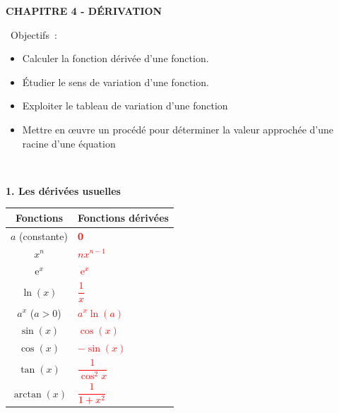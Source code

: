 \documentclass[11pt,a4paper]{article}
\DeclareMathOperator{\e}{e}
\begin{document}
\begin{mybox}
\begin{center}    
\textbf{\Large CHAPITRE 4 - DÉRIVATION}\end{center}
\end{mybox}
\vfill
  \begin{bclogo}[couleur = blue!10,logo=\bcinfo,  arrondi = 0.1]
{~Objectifs~:}
~~
\begin{itemize}

\item Calculer la fonction dérivée d'une fonction.
\item Étudier le sens de variation d'une fonction.
\item Exploiter le tableau de variation d'une fonction
\item Mettre en œuvre un procédé pour déterminer la valeur approchée d'une racine d'une équation 
    
    
\end{itemize}
~~
\end{bclogo}

\vfill


\begin{mybox}
\begin{center}    
\textbf{1. Les dérivées usuelles}\end{center}
\end{mybox}
\vfill




\begin{center}
\renewcommand{\arraystretch}{2.6}

\begin{tabularx}{0.7\linewidth}{|c||>{\centering\arraybackslash}X|}
\hline 
Fonctions & Fonctions dérivées \\ 
\hline 
$a$ (constante) & \textcolor{red}{\textbf{0}} \\ 
\hline 
$x^n$ & \textcolor{red}{\textbf{$nx^{n-1}$}} \\ 
\hline 
$\e^x$ & \textcolor{red}{\textbf{$\e^x$}} \\ 
\hline 
$\ln(x)$ & \textcolor{red}{\textbf{$\dfrac{1}{x}$}} \\ 
\hline 
$a^x$ ($a>0$) & \textcolor{red}{\textbf{$a^x\ln(a)$}} \\ 
\hline 
$\sin(x)$ & \textcolor{red}{\textbf{$\cos(x)$}} \\ 
\hline 
$\cos(x)$ & \textcolor{red}{\textbf{$-\sin(x)$}} \\ 
\hline 
$\tan(x)$ & \textcolor{red}{\textbf{$\dfrac{1}{\cos^2 x}$}} \\ 
\hline 
$\arctan(x)$ & \textcolor{red}{\textbf{$\dfrac{1}{1+x^2}$}} \\ 
\hline
\end{tabularx}



\end{center}
\end{document}
